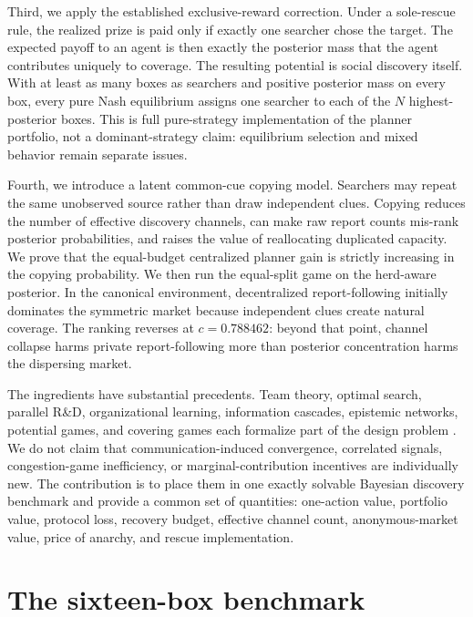 \documentclass[11pt]{article}
\theoremstyle{definition}
\theoremstyle{remark}
\newcommand{\1}{\mathbf{1}}
\begin{document}
Third, we apply the established exclusive-reward correction. Under a sole-rescue rule, the realized prize is paid only if exactly one searcher chose the target. The expected payoff to an agent is then exactly the posterior mass that the agent contributes uniquely to coverage. The resulting potential is social discovery itself. With at least as many boxes as searchers and positive posterior mass on every box, every pure Nash equilibrium assigns one searcher to each of the $N$ highest-posterior boxes. This is full pure-strategy implementation of the planner portfolio, not a dominant-strategy claim: equilibrium selection and mixed behavior remain separate issues.

Fourth, we introduce a latent common-cue copying model. Searchers may repeat the same unobserved source rather than draw independent clues. Copying reduces the number of effective discovery channels, can make raw report counts mis-rank posterior probabilities, and raises the value of reallocating duplicated capacity. We prove that the equal-budget centralized planner gain is strictly increasing in the copying probability. We then run the equal-split game on the herd-aware posterior. In the canonical environment, decentralized report-following initially dominates the symmetric market because independent clues create natural coverage. The ranking reverses at $c=0.788462$: beyond that point, channel collapse harms private report-following more than posterior concentration harms the dispersing market.

The ingredients have substantial precedents. Team theory, optimal search, parallel R\&D, organizational learning, information cascades, epistemic networks, potential games, and covering games each formalize part of the design problem \citep{MarschakRadner1972,Koopman1957,Nelson1961,March1991,Banerjee1992,BikhchandaniEtAl1992,Zollman2007,MondererShapley1996,Gairing2009}. We do not claim that communication-induced convergence, correlated signals, congestion-game inefficiency, or marginal-contribution incentives are individually new. The contribution is to place them in one exactly solvable Bayesian discovery benchmark and provide a common set of quantities: one-action value, portfolio value, protocol loss, recovery budget, effective channel count, anonymous-market value, price of anarchy, and rescue implementation.

\section{The sixteen-box benchmark}
\label{sec:benchmark}
\end{document}

